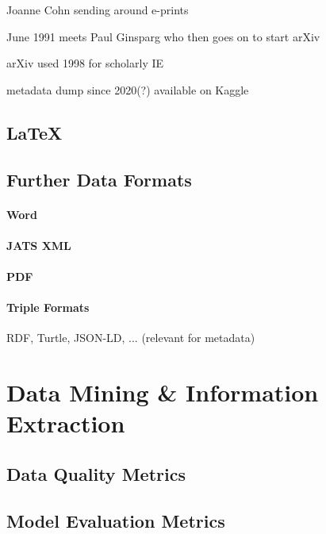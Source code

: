 
Joanne Cohn sending around e-prints~\cite{Feder2021,Turner2012}

June 1991 meets Paul Ginsparg who then goes on to start arXiv~\cite{Ginsparg2011a,Ginsparg2011}

arXiv used 1998 for scholarly IE~\cite{Nanba1998}

metadata dump since 2020(?) available on Kaggle~\cite{arxiv_kaggle_dataset}

\subsection{\LaTeX}

\subsection{Further Data Formats}

\paragraph{Word}

\paragraph{JATS XML}

\paragraph{PDF}

\paragraph{Triple Formats}
RDF, Turtle, JSON-LD, ... (relevant for metadata)



\section{Data Mining \& Information Extraction}


\subsection{Data Quality Metrics}

\subsection{Model Evaluation Metrics}
